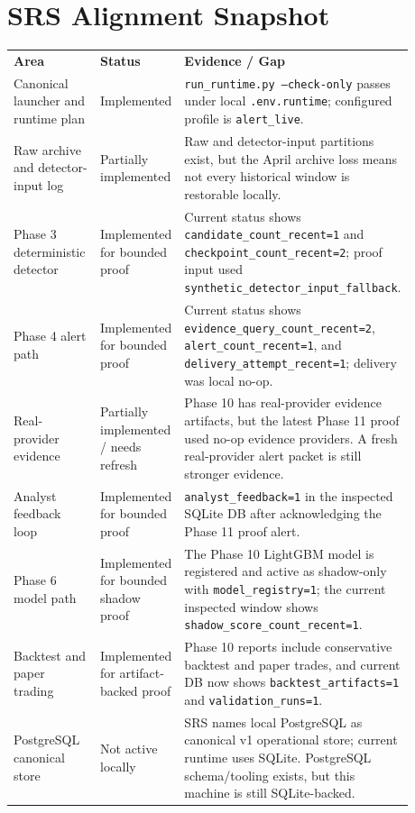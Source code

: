 \documentclass{article}
\begin{document}
\section*{SRS Alignment Snapshot}
\begin{longtable}{p{0.30\linewidth}p{0.20\linewidth}p{0.38\linewidth}}
\textbf{Area} & \textbf{Status} & \textbf{Evidence / Gap} \\
Canonical launcher and runtime plan & Implemented & \texttt{run\_runtime.py --check-only} passes under local \texttt{.env.runtime}; configured profile is \texttt{alert\_live}. \\
Raw archive and detector-input log & Partially implemented & Raw and detector-input partitions exist, but the April archive loss means not every historical window is restorable locally. \\
Phase 3 deterministic detector & Implemented for bounded proof & Current status shows \texttt{candidate\_count\_recent=1} and \texttt{checkpoint\_count\_recent=2}; proof input used \texttt{synthetic\_detector\_input\_fallback}. \\
Phase 4 alert path & Implemented for bounded proof & Current status shows \texttt{evidence\_query\_count\_recent=2}, \texttt{alert\_count\_recent=1}, and \texttt{delivery\_attempt\_recent=1}; delivery was local no-op. \\
Real-provider evidence & Partially implemented / needs refresh & Phase 10 has real-provider evidence artifacts, but the latest Phase 11 proof used no-op evidence providers. A fresh real-provider alert packet is still stronger evidence. \\
Analyst feedback loop & Implemented for bounded proof & \texttt{analyst\_feedback=1} in the inspected SQLite DB after acknowledging the Phase 11 proof alert. \\
Phase 6 model path & Implemented for bounded shadow proof & The Phase 10 LightGBM model is registered and active as shadow-only with \texttt{model\_registry=1}; the current inspected window shows \texttt{shadow\_score\_count\_recent=1}. \\
Backtest and paper trading & Implemented for artifact-backed proof & Phase 10 reports include conservative backtest and paper trades, and current DB now shows \texttt{backtest\_artifacts=1} and \texttt{validation\_runs=1}. \\
PostgreSQL canonical store & Not active locally & SRS names local PostgreSQL as canonical v1 operational store; current runtime uses SQLite. PostgreSQL schema/tooling exists, but this machine is still SQLite-backed. \\

\end{longtable}
\end{document}
